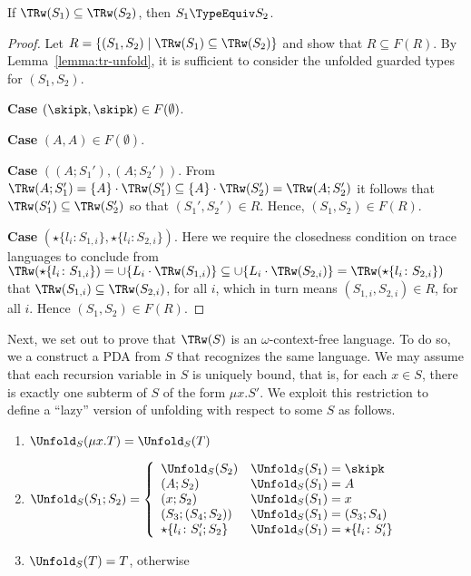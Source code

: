 \begin{lemma}
  If  $\TRw (S_1) \subseteq \TRw (S_2)$, then  $S_1 \TypeEquiv S_2$.
\end{lemma}
\begin{proof}
  Let $R = \{ (S_1, S_2) \mid \TRw (S_1) \subseteq \TRw (S_2) \}$ and show that $R
  \subseteq  F(R)$. 
  By Lemma~\ref{lemma:tr-unfold}, it is sufficient to consider the unfolded guarded types
  for $(S_1, S_2)$.

  \textbf{Case }$(\skipk, \skipk) \in F (\emptyset)$.

  \textbf{Case }$(A, A) \in F (\emptyset)$.

  \textbf{Case }$((A;S_1'), (A; S_2'))$. From $\TRw (A; S_1') = \{A\} \cdot \TRw (S_1') \subseteq
  \{A\} \cdot \TRw (S_2') = \TRw (A; S_2')$ it follows that $\TRw (S_1') \subseteq \TRw (S_2')$ so that
  $(S_1', S_2') \in R$. Hence, $(S_1, S_2) \in F (R)$.

  \sloppypar
    \textbf{Case
    }$(\star\{l_i\colon S_{1,i}\}, \star\{l_i\colon
    S_{2,i}\})$.
    Here we require the closedness condition on trace languages to
    conclude from
    $\TRw (\star\{l_i\colon S_{1,i}\}) = {\cup} \{ L_i \cdot \TRw
    (S_{1,i}) \} \subseteq {\cup} \{ L_i \cdot \TRw (S_{2,i}) \} =
    \TRw (\star\{l_i\colon S_{2,i}\}) $
    that $\TRw (S_{1,i}) \subseteq \TRw (S_{2,i})$, for all $i$, which
    in turn means $(S_{1,i}, S_{2,i}) \in R$, for all $i$. Hence
    $(S_1, S_2) \in F(R)$.
\end{proof}
\clearpage{}
Next, we set out to prove that $\TRw (S)$ is an $\omega$-context-free language. To do so, we a
construct a PDA from $S$ that recognizes the same language. We may assume that each recursion variable
in $S$ is uniquely bound, that is, for each $x\in S$, there is exactly one subterm of $S$ of the
form $\mu x.S'$.
We exploit this restriction to define a ``lazy'' version of unfolding with respect to some $S$ as follows.
\begin{enumerate}
\item $\Unfold_S(\mu x.T) = \Unfold_S(T)$
\item $\Unfold_S (S_1;S_2) = \left\{%
  \begin{array}{ll}
    \Unfold_S(S_2) & \Unfold_S(S_1) = \skipk
    \\
    (A; S_2) & \Unfold_S(S_1) = A
    \\
    (x; S_2) & \Unfold_S(S_1) = x
    \\
    (S_3; (S_4;S_2)) & \Unfold_S(S_1) = (S_3;S_4)
    \\
    \star\{l_i\colon S'_i;S_2\}  & \Unfold_S (S_1) = \star\{l_i\colon S'_i\}
  \end{array}
  \right.
$
\item $\Unfold_S(T) = T$, otherwise
\end{enumerate}
